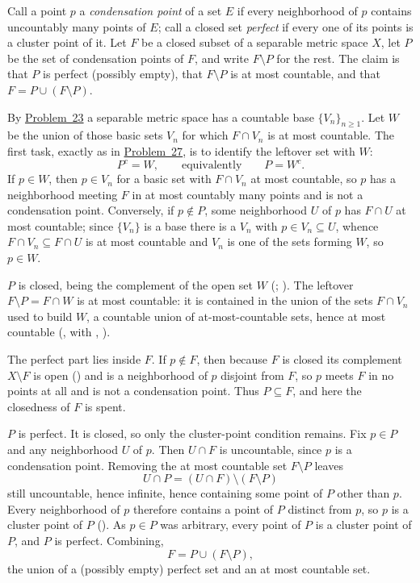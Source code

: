 \documentclass[main.tex]{subfiles}
\begin{document}
\begin{SolutionBlue}
Call a point $p$ a \emph{condensation point} of a set $E$ if every neighborhood of $p$ contains
uncountably many points of $E$; call a closed set \emph{perfect} if every one of its points is a cluster
point of it. Let $F$ be a closed subset of a separable metric space $X$, let $P$ be the set of
condensation points of $F$, and write $F\setminus P$ for the rest. The claim is that $P$ is perfect
(possibly empty), that $F\setminus P$ is at most countable, and that $F=P\cup(F\setminus P)$.

By \hyperlink{prob:23}{Problem~23} a separable metric space has a countable base $\{V_n\}_{n\ge 1}$. Let
$W$ be the union of those basic sets $V_n$ for which $F\cap V_n$ is at most countable. The first task,
exactly as in \hyperlink{prob:27}{Problem~27}, is to identify the leftover set with $W$:
\[
  P^c=W,\qquad\text{equivalently}\qquad P=W^c .
\]
If $p\in W$, then $p\in V_n$ for a basic set with $F\cap V_n$ at most countable, so $p$ has a neighborhood
meeting $F$ in at most countably many points and is not a condensation point. Conversely, if $p\notin P$,
some neighborhood $U$ of $p$ has $F\cap U$ at most countable; since $\{V_n\}$ is a base there is a $V_n$
with $p\in V_n\subseteq U$, whence $F\cap V_n\subseteq F\cap U$ is at most countable and $V_n$ is one of
the sets forming $W$, so $p\in W$.

$P$ is closed, being the complement of the open set $W$ (;
). The leftover $F\setminus P=F\cap W$ is at most countable: it is
contained in the union of the sets $F\cap V_n$ used to build $W$, a countable union of at-most-countable
sets, hence at most countable (, with
, ).

The perfect part lies inside $F$. If $p\notin F$, then because $F$ is closed its complement $X\setminus F$
is open () and is a neighborhood of $p$ disjoint from $F$, so $p$ meets $F$ in no points at
all and is not a condensation point. Thus $P\subseteq F$, and here the closedness of $F$ is spent.

$P$ is perfect. It is closed, so only the cluster-point condition remains. Fix $p\in P$ and any
neighborhood $U$ of $p$. Then $U\cap F$ is uncountable, since $p$ is a condensation point. Removing the at
most countable set $F\setminus P$ leaves
\[
  U\cap P=(U\cap F)\setminus(F\setminus P)
\]
still uncountable, hence infinite, hence containing some point of $P$ other than $p$. Every neighborhood of
$p$ therefore contains a point of $P$ distinct from $p$, so $p$ is a cluster point of $P$
(). As $p\in P$ was arbitrary, every point of $P$ is a cluster point of $P$, and $P$ is
perfect. Combining,
\[
  F=P\cup(F\setminus P),
\]
the union of a (possibly empty) perfect set and an at most countable set.


\end{SolutionBlue}
\end{document}
